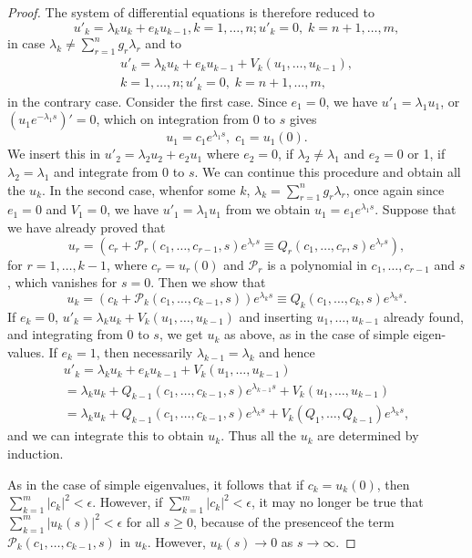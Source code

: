 \begin{proof}
The system of differential equations is therefore reduced to
$$
u'_k = \lambda_k u_k + e_k u_{k-1}, k =1, \ldots, n; u'_k =0,\; k = n+1, \ldots, m,
$$
in case $\lambda_k \neq \sum\limits^n_{r=1} g_r \lambda_r$ and to 
\begin{gather*}
u'_k = \lambda_k u_k + e_k u_{k-1} + V_k (u_1, \ldots, u_{k-1}),\\ 
k =1, \ldots, n; u'_k = 0, \; k=n+1, \ldots, m, 
\end{gather*}
in the contrary case. Consider the first case. Since $e_1 = 0$, we
have $u'_1 = \lambda_1 u_1$, or $(u_1 e^{-\lambda_1s})' = 0$, which on
integration from 0 to $s$ gives 
$$
u_1 = c_1 e^{\lambda_1 s}, \; c_1 = u_1 (0).
$$
We insert this in $u'_2 = \lambda_2 u_2 + e_2 u_1$ where $e_2 = 0$, if
$\lambda_2 \neq \lambda_1$ and $e_2 =0$ or 1, if $\lambda_2 =
\lambda_1$ and integrate from 0 to $s$. We can continue this procedure
and obtain all the $u_k$. In the second case, when\pageoriginale for
some $k$, $\lambda_k =\sum\limits^n_{r=1} g_r \lambda_r$, once again
since $e_1=0$ and $V_1 = 0$, we have $u'_1 = \lambda_1 u_1$ from we
obtain $u_1 = e_1 e^{\lambda_1 s}$. Suppose that we have already
proved that  
$$
u_r = (c_r + \mathscr{P}_r (c_1, \ldots, c_{r-1}, s) e^{\lambda_r s}
\equiv Q_r (c_1, \ldots, c_r, s)e^{\lambda_r s}), 
$$
for $r=1, \ldots, k-1$, where $c_r = u_r (0)$ and $\mathscr{P}_r$ is a
polynomial in $c_1, \ldots, c_{r-1}$ and $s$, which vanishes for
$s=0$. Then we show that  
$$
u_k = (c_k + \mathscr{P}_k (c_1, \ldots, c_{k-1}, s))e^{\lambda_k s}
\equiv Q_k (c_1, \ldots, c_k, s) e^{\lambda_k s}. 
$$
If $e_k = 0$, $u'_k = \lambda_k u_k + V_k (u_1, \ldots, u_{k-1})$ and
inserting $u_1, \ldots, u_{k-1}$ already found, and integrating from 0
to $s$, we get $u_k$ as above, as in the case of simple
eigen-values. If $e_k=1$, then necessarily $\lambda_{k-1} = \lambda_k$
and hence 
\begin{gather*}
u'_k = \lambda_k u_k + e_k u_{k-1} + V_k (u_1, \ldots, u_{k-1})\\
= \lambda_k u_k + Q_{k-1} (c_1, \ldots, c_{k-1}, s) e^{\lambda_{k-1}
  s} + V_k (u_1, \ldots, u_{k-1})\\ 
= \lambda_k u_k + Q_{k-1} (c_1, \ldots, c_{k-1}, s) e^{\lambda_ks} +
V_k (Q_1, \ldots, Q_{k-1})e^{\lambda_k s}, 
\end{gather*}
and we can integrate this to obtain $u_k$. Thus all the $u_k$ are
determined by induction. 

As in the case of simple eigenvalues, it follows that if $c_k =
u_k(0)$, then $\sum\limits^m_{k=1} |c_k|^2 < \epsilon$. However, if
$\sum\limits^m_{k=1} |c_k|^2 < \epsilon$, it may no longer be true
that $\sum\limits^m_{k=1} |u_k (s)|^2 < \epsilon$ for all $s \geq 0$,
because of the presence\pageoriginale of the term $\mathscr{P}_k (c_1,
\ldots, c_{k-1}, s)$ in $u_k$. However, $u_k(s) \to 0$ as $s \to
\infty$. 


\end{proof}
